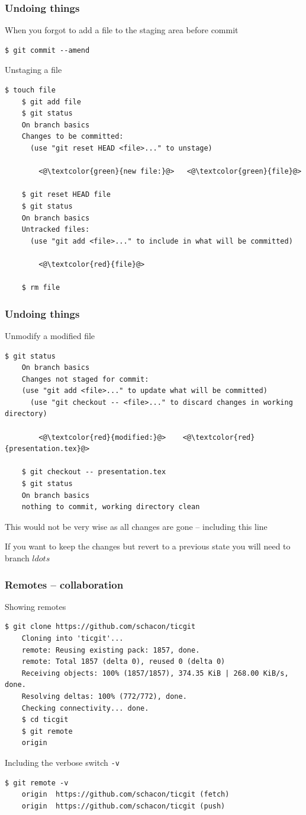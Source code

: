 \documentclass{beamer}
\begin{document}
\begin{frame}[fragile]
  \frametitle{Undoing things}
  When you forgot to add a file to the staging area before commit
  \begin{lstlisting}[basicstyle=\ttfamily\tiny]
    $ git commit --amend
  \end{lstlisting}

  Unstaging a file
  \begin{lstlisting}[basicstyle=\ttfamily\tiny]
    $ touch file
    $ git add file
    $ git status
    On branch basics
    Changes to be committed:
      (use "git reset HEAD <file>..." to unstage)

        <@\textcolor{green}{new file:}@>   <@\textcolor{green}{file}@>

    $ git reset HEAD file
    $ git status
    On branch basics
    Untracked files:
      (use "git add <file>..." to include in what will be committed)

        <@\textcolor{red}{file}@>

    $ rm file
  \end{lstlisting}
\end{frame}

\begin{frame}[fragile]
  \frametitle{Undoing things}
  Unmodify a modified file
  \begin{lstlisting}[basicstyle=\ttfamily\tiny]
    $ git status
    On branch basics
    Changes not staged for commit:
    (use "git add <file>..." to update what will be committed)
      (use "git checkout -- <file>..." to discard changes in working directory)

	    <@\textcolor{red}{modified:}@>    <@\textcolor{red}{presentation.tex}@>
    
    $ git checkout -- presentation.tex
    $ git status
    On branch basics
    nothing to commit, working directory clean
  \end{lstlisting}
  This would not be very wise as all changes are gone -- including this line

  If you want to  keep the changes but revert to a previous state you will need to branch $ldots$
\end{frame}

\begin{frame}[fragile]
  \frametitle{Remotes -- collaboration}
  Showing remotes
  \begin{lstlisting}[basicstyle=\ttfamily\tiny]
    $ git clone https://github.com/schacon/ticgit
    Cloning into 'ticgit'...
    remote: Reusing existing pack: 1857, done.
    remote: Total 1857 (delta 0), reused 0 (delta 0)
    Receiving objects: 100% (1857/1857), 374.35 KiB | 268.00 KiB/s, done.
    Resolving deltas: 100% (772/772), done.
    Checking connectivity... done.
    $ cd ticgit
    $ git remote
    origin
  \end{lstlisting}

  Including the verbose switch \lstinline{-v}
  \begin{lstlisting}[basicstyle=\ttfamily\tiny]
    $ git remote -v
    origin	https://github.com/schacon/ticgit (fetch)
    origin	https://github.com/schacon/ticgit (push)
  \end{lstlisting}
\end{frame}
\end{document}
